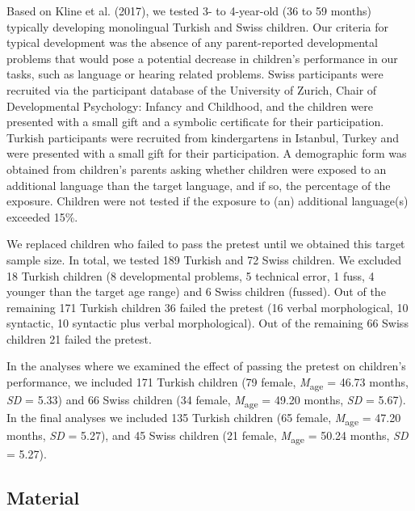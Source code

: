 \documentclass[man]{apa6}
\begin{document}
Based on Kline et al. (2017), we tested 3- to 4-year-old (36 to 59
months) typically developing monolingual Turkish and Swiss children. Our
criteria for typical development was the absence of any parent-reported
developmental problems that would pose a potential decrease in
children's performance in our tasks, such as language or hearing related
problems. Swiss participants were recruited via the participant database
of the University of Zurich, Chair of Developmental Psychology: Infancy
and Childhood, and the children were presented with a small gift and a
symbolic certificate for their participation. Turkish participants were
recruited from kindergartens in Istanbul, Turkey and were presented with
a small gift for their participation. A demographic form was obtained
from children's parents asking whether children were exposed to an
additional language than the target language, and if so, the percentage
of the exposure. Children were not tested if the exposure to (an)
additional language(s) exceeded 15\%.

We replaced children who failed to pass the pretest until we obtained
this target sample size. In total, we tested 189 Turkish and 72 Swiss
children. We excluded 18 Turkish children (8 developmental problems, 5
technical error, 1 fuss, 4 younger than the target age range) and 6
Swiss children (fussed). Out of the remaining 171 Turkish children 36
failed the pretest (16 verbal morphological, 10 syntactic, 10 syntactic
plus verbal morphological). Out of the remaining 66 Swiss children 21
failed the pretest.

In the analyses where we examined the effect of passing the pretest on
children's performance, we included 171 Turkish children (79 female,
\emph{M}\textsubscript{age} = 46.73 months, \emph{SD} = 5.33) and 66
Swiss children (34 female, \emph{M}\textsubscript{age} = 49.20 months,
\emph{SD} = 5.67). In the final analyses we included 135 Turkish
children (65 female, \emph{M}\textsubscript{age} = 47.20 months,
\emph{SD} = 5.27), and 45 Swiss children (21 female,
\emph{M}\textsubscript{age} = 50.24 months, \emph{SD} = 5.27).

\subsection{Material}\label{material}
\end{document}
